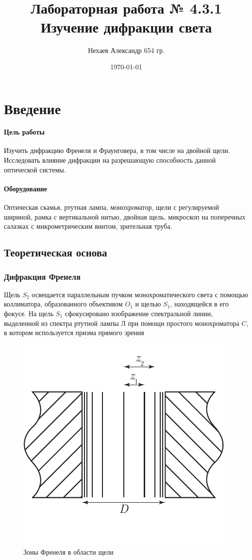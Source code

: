\documentclass[a4paper, 12pt]{article}
\title{Лабораторная работа № 4.3.1\\Изучение дифракции света}
\author{Нехаев Александр 654 гр.}
\date{\today}
\begin{document}
	\maketitle
	\newpage
	\tableofcontents
	\newpage
	\section{Введение}
	\paragraph{Цель работы} Изучить дифракцию Френеля и Фраунговера, в том числе на двойной щели. Исследовать  влияние дифракции на разрешающую способность данной оптической системы.
	\paragraph{Оборудование} Оптическая скамья, ртутная лампа, монохроматор, щели с регулируемой шириной, рамка с вертикальной нитью, двойная щель, микроскоп на поперечных салазках с микрометрическим винтом, зрительная труба.
	\subsection{Теоретическая основа}
	\subsubsection{Дифракция Френеля}
	Щель $S_2$ освещается параллельным пучком монохроматического света с помощью коллиматора, образованного объективом $O_1$ и щелью $S_1$, находящейся в его фокусе. На щель $S_1$ сфокусировано изображение спектральной линии, выделенной из спектра ртутной лампы $\text{Л}$ при помощи простого монохроматора $C$, в котором используется призма прямого зрения\par
	\begin{figure}
		\includegraphics[scale=0.9]{Fig1.pdf}
		\caption{Зоны Френеля в области щели}
		\label{pic:1}
	\end{figure}
\end{document}

